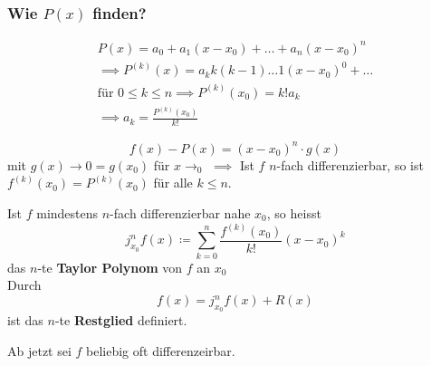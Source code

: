 \subsubsection{Wie $P(x)$ finden?}
\begin{gather*}
	P(x) = a_0 + a_1 (x-x_0) + \dots + a_n (x-x_0)^n \\
	\implies P^{(k)}(x) = a_k k (k-1) \dots 1 (x-x_0)^0 + \dots \\
	\text{für } 0 \leq k \leq n \implies P^{(k)}(x_0) = k! a_k \\
	\implies a_k = \frac{P^{(k)}(x_0)}{k!}
\end{gather*}
\begin{bem}
	\[ f(x) - P(x) = (x-x_0)^n \cdot g(x) \]
	mit $g(x) \rightarrow 0 = g(x_0)$ für $x \rightarrow _0$
	$\implies$ Ist $f$ $n$-fach differenzierbar, so ist $f^{(k)}(x_0) = P^{(k)}(x_0)$ für alle $k \leq n$.
\end{bem}
\begin{def*}[note = Taylor Polynom , index = Taylor Polynom]
	Ist $f$ mindestens $n$-fach differenzierbar nahe $x_0$, so heisst
	\[ j_{x_0}^n f(x) \coloneqq \sum_{k=0}^n \frac{f^{(k)}(x_0)}{k!} (x-x_0)^k \]
	das $n$-te \textbf{Taylor Polynom} von $f$ an $x_0$ \\
	Durch
	\[ f(x) = j_{x_0}^n f(x) + R(x) \]
	ist das $n$-te \textbf{Restglied} definiert.
\end{def*}
Ab jetzt sei $f$ beliebig oft differenzeirbar. \\

